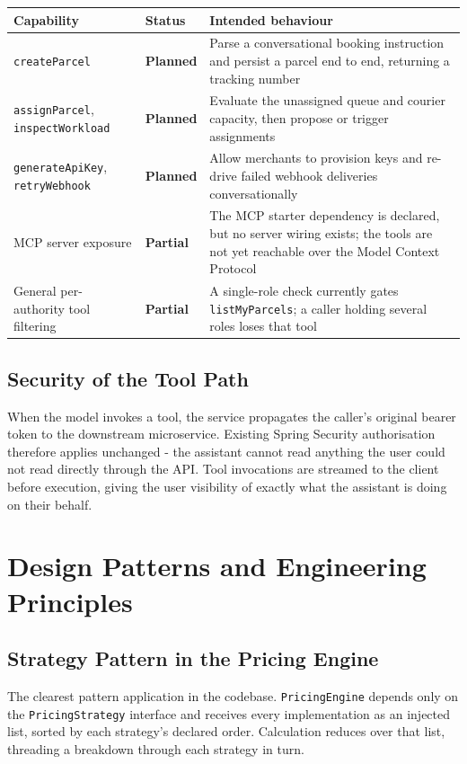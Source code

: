 \documentclass[11pt,a4paper,oneside,openany]{report}
\newcommand{\Partial}{\textbf{Partial}}
\newcommand{\Planned}{\textbf{Planned}}
\newcommand{\code}[1]{\texttt{\small #1}}
\begin{document}
\begin{center}
\small
\begin{tabular}{@{}p{3.6cm}p{2.3cm}p{7.9cm}@{}}
\toprule
\textbf{Capability} & \textbf{Status} & \textbf{Intended behaviour} \\
\midrule
\code{createParcel} & \Planned & Parse a conversational booking instruction and persist a parcel
end to end, returning a tracking number \\
\addlinespace
\code{assignParcel}, \code{inspectWorkload} & \Planned & Evaluate the unassigned queue and courier
capacity, then propose or trigger assignments \\
\addlinespace
\code{generateApiKey}, \code{retryWebhook} & \Planned & Allow merchants to provision keys and
re-drive failed webhook deliveries conversationally \\
\addlinespace
MCP server exposure & \Partial & The MCP starter dependency is declared, but no server wiring
exists; the tools are not yet reachable over the Model Context Protocol \\
\addlinespace
General per-authority tool filtering & \Partial & A single-role check currently gates
\code{listMyParcels}; a caller holding several roles loses that tool \\
\bottomrule
\end{tabular}
\label{tab:aiplanned}
\end{center}

\section{Security of the Tool Path}
When the model invokes a tool, the service propagates the caller's original bearer token to the
downstream microservice. Existing Spring Security authorisation therefore applies unchanged - the
assistant cannot read anything the user could not read directly through the API. Tool invocations
are streamed to the client before execution, giving the user visibility of exactly what the
assistant is doing on their behalf.

\chapter{Design Patterns and Engineering Principles}

\section{Strategy Pattern in the Pricing Engine}
The clearest pattern application in the codebase. \code{PricingEngine} depends only on the
\code{PricingStrategy} interface and receives every implementation as an injected list, sorted by
each strategy's declared order. Calculation reduces over that list, threading a breakdown through
each strategy in turn.
\end{document}
